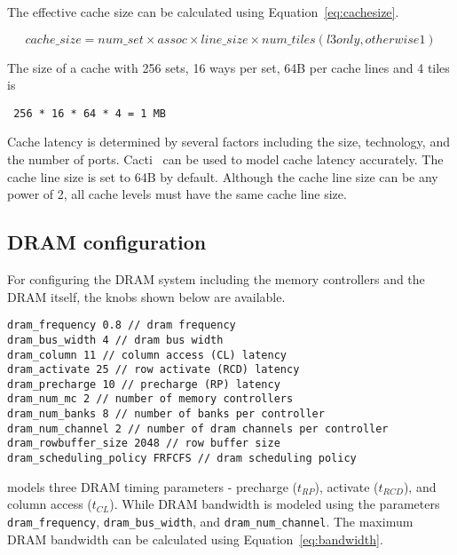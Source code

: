 The effective cache size can be calculated using Equation~\ref{eq:cachesize}.

\begin{equation}
\label{eq:cachesize}
cache\_size = num\_set \times assoc \times line\_size \times num\_tiles (l3 only, otherwise 1)
\end{equation}


\noindent

The size of a cache with 256 sets, 16 ways per set, 64B per cache lines and 4
tiles is 

\Verb+ 256 * 16 * 64 * 4 = 1 MB +

\noindent
Cache latency is determined by several factors including the
size, technology, and the number of ports. Cacti~\cite{cacti} can be
used to model cache latency accurately. The cache line size is set to
64B by default. Although the cache line size can be any power of 2,
all cache levels must have the same cache line size.


\subsection{DRAM configuration}
\label{sec:param-dram}

For configuring the DRAM system including the memory controllers and the DRAM
itself, the knobs shown below are available. 


\begin{Verbatim}
dram_frequency 0.8 // dram frequency
dram_bus_width 4 // dram bus width
dram_column 11 // column access (CL) latency
dram_activate 25 // row activate (RCD) latency
dram_precharge 10 // precharge (RP) latency
dram_num_mc 2 // number of memory controllers
dram_num_banks 8 // number of banks per controller
dram_num_channel 2 // number of dram channels per controller
dram_rowbuffer_size 2048 // row buffer size
dram_scheduling_policy FRFCFS // dram scheduling policy
\end{Verbatim}

\noindent
\SIM models three DRAM timing parameters - precharge ($t_{RP}$), activate
($t_{RCD}$), and column access ($t_{CL}$). While DRAM bandwidth is modeled using the
parameters \Verb+dram_frequency+, \Verb+dram_bus_width+, and
\Verb+dram_num_channel+. The maximum DRAM bandwidth can be calculated using
Equation~\ref{eq:bandwidth}. 

